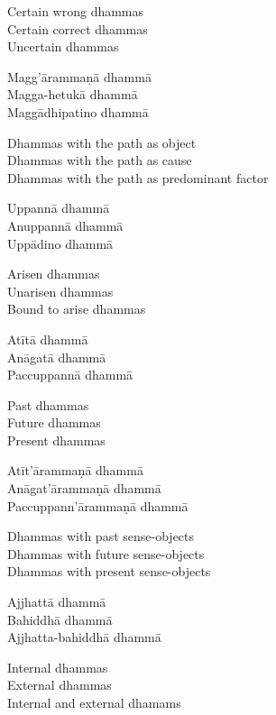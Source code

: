 \begin{english}
  Certain wrong dhammas\\
  Certain correct dhammas\\
  Uncertain dhammas
\end{english}

Magg’ārammaṇā dhammā\\
Magga-hetukā dhammā\\
Maggādhipatino dhammā

\begin{english}
  Dhammas with the path as object\\
  Dhammas with the path as cause\\
  Dhammas with the path as predominant factor
\end{english}

Uppannā dhammā\\
Anuppannā dhammā\\
Uppādino dhammā

\begin{english}
  Arisen dhammas\\
  Unarisen dhammas\\
  Bound to arise dhammas
\end{english}

Atītā dhammā\\
Anāgatā dhammā\\
Paccuppannā dhammā

\begin{english}
  Past dhammas\\
  Future dhammas\\
  Present dhammas
\end{english}

Atīt’ārammaṇā dhammā\\
Anāgat’ārammaṇā dhammā\\
Paccuppann’ārammaṇā dhammā

\begin{english}
  Dhammas with past sense-objects\\
  Dhammas with future sense-objects\\
  Dhammas with present sense-objects
\end{english}

Ajjhattā dhammā\\
Bahiddhā dhammā\\
Ajjhatta-bahiddhā dhammā

\begin{english}
  Internal dhammas\\
  External dhammas\\
  Internal and external dhamams
\end{english}

